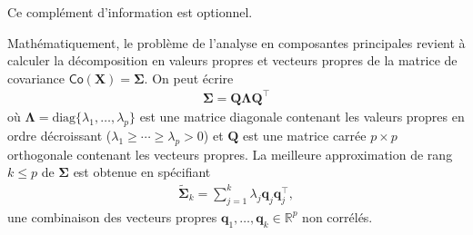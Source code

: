 \documentclass[
  11pt,
  letterpaper,
]{book}
\theoremstyle{definition}
\theoremstyle{remark}
\begin{document}
Ce complément d'information est optionnel.

Mathématiquement, le problème de l'analyse en composantes principales
revient à calculer la décomposition en valeurs propres et vecteurs
propres de la matrice de covariance
\(\mathsf{Co}(\boldsymbol{X})=\boldsymbol{\Sigma}\). On peut écrire
\begin{align*}
\boldsymbol{\Sigma} = \boldsymbol{Q}\boldsymbol{\Lambda}\boldsymbol{Q}^\top
\end{align*} où
\(\boldsymbol{\Lambda} = \mathrm{diag}\{\lambda_1, \ldots, \lambda_p\}\)
est une matrice diagonale contenant les valeurs propres en ordre
décroissant (\(\lambda_1 \geq \cdots \geq \lambda_p > 0\)) et
\(\boldsymbol{Q}\) est une matrice carrée \(p \times p\) orthogonale
contenant les vecteurs propres. La meilleure approximation de rang
\(k \leq p\) de \(\boldsymbol{\Sigma}\) est obtenue en spécifiant
\begin{align*}
\widetilde{\boldsymbol{\Sigma}}_k = \sum_{j=1}^k \lambda_j \boldsymbol{q}_j\boldsymbol{q}_j^\top,
\end{align*} une combinaison des vecteurs propres
\(\boldsymbol{q}_1, \ldots, \boldsymbol{q}_k \in \mathbb{R}^p\) non
corrélés.
\end{document}
